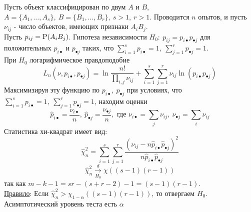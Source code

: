 \begin{example}
    Пусть объект классифицирован по двум $A$ и $B$,
    $A=\{A_1,\ldots,A_s\},\ B=\{B_1,\ldots,B_r\},\ s>1,\ r>1$.
    Проводится $n$ опытов, и пусть $\nu_{ij}$ - число объектов,
    имеющих признаки $A_iB_j$. \\
    Пусть $p_{ij}=\P(A_iB_j)$. Гипотеза независимости
    $H_0:\ p_{ij}=p_{i\bullet}p_{\bullet j}$ для положительных $p_{i\bullet}$ и $p_{\bullet j}$
    таких, что $\sum_{i=1}^sp_{i\bullet}=1,\ \sum_{j=1}^rp_{\bullet j}=1$. \\
    При $H_0$ логарифмическое правдоподобие
    \[L_n(\nu,p_{i\bullet},p_{\bullet j})=\ln\frac{n!}{\prod_{i,j}\nu_{ij}}+\sum_{i=1}^s\sum_{j=1}^r\nu_{ij}\ln(p_{i\bullet}p_{\bullet j})\]
    Максимизируя эту функцию по $p_{i\bullet},\ p_{\bullet j}$ при условиях, что $\sum_{i=1}^sp_{i\bullet}=1,\ \sum_{j=1}^rp_{\bullet j}=1$,
    находим оценки
    \[\widehat{p}_{i\bullet}=\frac{\nu_{i\bullet}}{n},\ \widehat{p}_{\bullet j}=\frac{\nu_{\bullet j}}{n},\text{ где } \nu_{i\bullet}=\sum_{j}\nu_{ij},\ \nu_{\bullet j}=\sum_{i}\nu_{ij}\]
    Статистика хи-квадрат имеет вид:
    \[\widehat{\chi}_n^2=\sum_{i=1}^s\sum_{j=1}^r\frac{(\nu_{ij}-n\widehat{p}_{i\bullet}\widehat{p}_{\bullet j})^2}{n\widehat{p}_{i\bullet}\widehat{p}_{\bullet j}}\]
    \[\widehat{\chi}_n^2\xrightarrow[H_0]{d}\chi((s-1)(r-1))\]
    так как $m-k-1=sr-(s+r-2)-1=(s-1)(r-1)$. \\
    \underline{Правило}: Если $\widehat{\chi}_n^2>\chi_{1-\alpha}((s-1)(r-1))$,
    то отвергаем $H_0$. Асимптотический уровень теста есть $\alpha$
\end{example}

